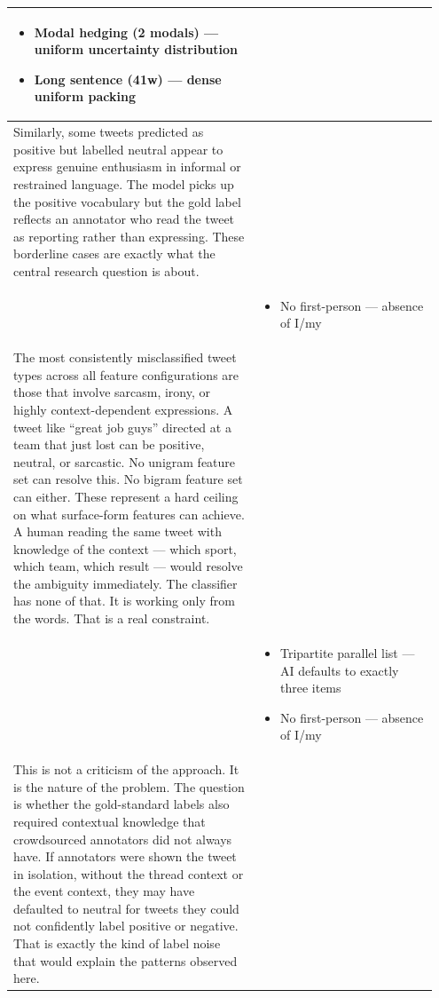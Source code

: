 \documentclass[11pt]{article}
\begin{document}
\begin{longtable}{|p{0.55\linewidth}|p{0.40\linewidth}|}
\begin{itemize}[leftmargin=1em,itemsep=1pt,topsep=1pt,parsep=0pt]
  \item Modal hedging (2 modals) --- uniform uncertainty distribution
  \item Long sentence (41w) --- dense uniform packing
\end{itemize} \\
\hline
Similarly, some tweets predicted as positive but labelled neutral appear to express genuine enthusiasm in informal or restrained language. The model picks up the positive vocabulary but the gold label reflects an annotator who read the tweet as reporting rather than expressing. These borderline cases are exactly what the central research question is about. & \\[2pt]
\hline
\rule[-3.5cm]{0pt}{3.5cm} & \begin{itemize}[leftmargin=1em,itemsep=1pt,topsep=1pt,parsep=0pt]
  \item No first-person --- absence of I/my
\end{itemize} \\
\hline
The most consistently misclassified tweet types across all feature configurations are those that involve sarcasm, irony, or highly context-dependent expressions. A tweet like ``great job guys'' directed at a team that just lost can be positive, neutral, or sarcastic. No unigram feature set can resolve this. No bigram feature set can either. These represent a hard ceiling on what surface-form features can achieve. A human reading the same tweet with knowledge of the context --- which sport, which team, which result --- would resolve the ambiguity immediately. The classifier has none of that. It is working only from the words. That is a real constraint. & \\[2pt]
\hline
\rule[-3.5cm]{0pt}{3.5cm} & \begin{itemize}[leftmargin=1em,itemsep=1pt,topsep=1pt,parsep=0pt]
  \item Tripartite parallel list --- AI defaults to exactly three items
  \item No first-person --- absence of I/my
\end{itemize} \\
\hline
This is not a criticism of the approach. It is the nature of the problem. The question is whether the gold-standard labels also required contextual knowledge that crowdsourced annotators did not always have. If annotators were shown the tweet in isolation, without the thread context or the event context, they may have defaulted to neutral for tweets they could not confidently label positive or negative. That is exactly the kind of label noise that would explain the patterns observed here. & \\[2pt]

\end{longtable}
\end{document}
